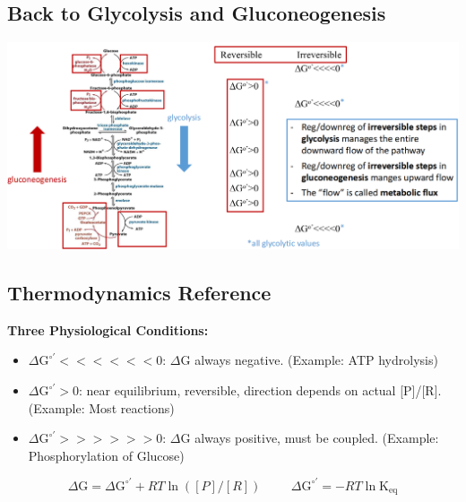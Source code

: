 \documentclass[10pt]{article}
\begin{document}
\subsection*{Back to Glycolysis and Gluconeogenesis}
\begin{center}
    \includegraphics*[width=\textwidth]{L2_20.png}
\end{center}

\subsection*{Thermodynamics Reference}
\textbf{Three Physiological Conditions:}
\begin{itemize}
	\item $\Delta \text{G}^{\circ'} <<<<<< 0$: $\Delta$G always negative.  (Example: ATP hydrolysis)
	\item $\Delta \text{G}^{\circ'} > 0$: near equilibrium, reversible, direction depends on actual [P]/[R].  (Example: Most reactions)
	\item $\Delta \text{G}^{\circ'} >>>>>> 0$: $\Delta$G always positive, must be coupled.  (Example: Phosphorylation of Glucose)
\end{itemize}
\[\Delta \text{G} = \Delta \text{G}^{\circ'}  + RT \ln([P]/[R]) \hspace{1cm} \Delta \text{G}^{\circ'} = -RT \ln \text{K}_{\text{eq}}\]
\end{document}
